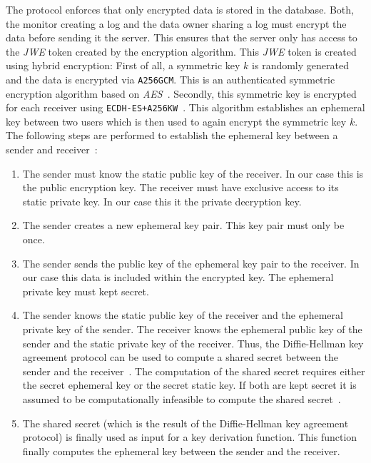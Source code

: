 \documentclass[../main.tex]{subfiles}
\begin{document}
The protocol enforces that only encrypted data is stored in the database.
Both, the monitor creating a log and the data owner sharing a log must encrypt the data before sending it the server.
This ensures that the server only has access to the \emph{JWE} token created by the encryption algorithm.
This \emph{JWE} token is created using hybrid encryption:
First of all, a symmetric key $k$ is randomly generated and the data is encrypted via \verb|A256GCM|.
This is an authenticated symmetric encryption algorithm based on \emph{AES}~\cite[section 4.7]{Jones2015}.
Secondly, this symmetric key is encrypted for each receiver using \verb|ECDH-ES+A256KW|~\cite[section 4.6]{Jones2015}.
This algorithm establishes an ephemeral key between two users which is then used to again encrypt the symmetric key $k$.
The following steps are performed to establish the ephemeral key between a sender and receiver~\cite[100]{Barker2017}:
\begin{enumerate}
    \item 
    The sender must know the static public key of the receiver. 
    In our case this is the public encryption key.
    The receiver must have exclusive access to its static private key.
    In our case this it the private decryption key.
    \item 
    The sender creates a new ephemeral key pair. 
    This key pair must only be once.
    \item 
    The sender sends the public key of the ephemeral key pair to the receiver.
    In our case this data is included within the encrypted key.
    The ephemeral private key must kept secret.
    \item 
    The sender knows the static public key of the receiver and the ephemeral private key of the sender.
    The receiver knows the ephemeral public key of the sender and the static private key of the receiver.
    Thus, the Diffie-Hellman key agreement protocol can be used to compute a shared secret between the sender and the receiver~\cite[section 9.3.6]{Eckert2018}.
    The computation of the shared secret requires either the secret ephemeral key or the secret static key.
    If both are kept secret it is assumed to be computationally infeasible to compute the shared secret~\cite[section 9.3.6]{Eckert2018}.
    \item 
    The shared secret (which is the result of the Diffie-Hellman key agreement protocol) is finally used as input for a key derivation function.
    This function finally computes the ephemeral key between the sender and the receiver.
\end{enumerate}
\end{document}
